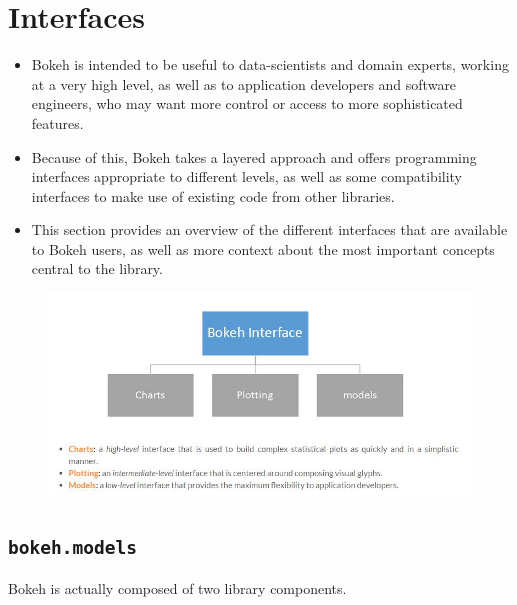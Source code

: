\documentclass[a4paper,12pt]{article}
\begin{document}
		\large
\section*{Interfaces}
\begin{itemize}
\item Bokeh is intended to be useful to data-scientists and domain experts, working at a very high level, as well as to application developers and software engineers, who may want more control or access to more sophisticated features. 
\item Because of this, Bokeh takes a layered approach and offers programming interfaces appropriate to different levels, as well as some compatibility interfaces to make use of existing code from other libraries. 

\item This section provides an overview of the different interfaces that are available to Bokeh users, as well as more context about the most important concepts central to the library. 
\end{itemize}


\begin{figure}[h!]
\centering
\includegraphics[width=1.1\linewidth]{images/00-Interfaces}
\end{figure}

\newpage

\subsection{\texttt{bokeh.models}}
Bokeh is actually composed of two library components.
\end{document}
